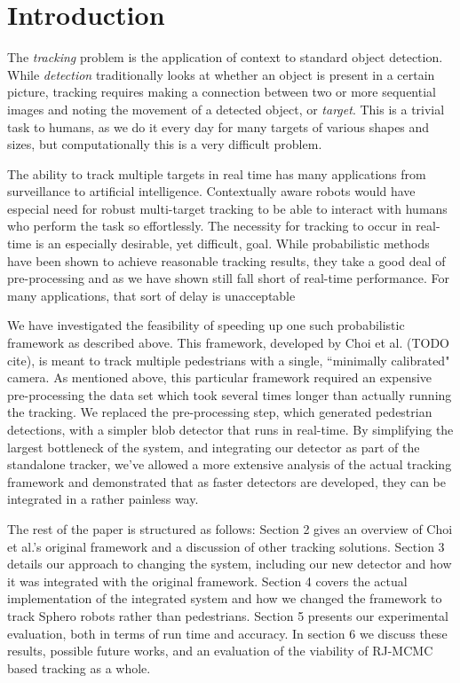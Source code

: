 \section{Introduction}
\label{sec:intro}

The \emph{tracking} problem is the application of context to standard object detection. While \emph{detection}
traditionally looks at whether an object is present in a certain picture, tracking requires making a connection between two
or more sequential images and noting the movement of a detected object, or \emph{target}. This is a trivial task to humans,
as we do it every day for many targets of various shapes and sizes, but computationally this is a very difficult problem.

The ability to track multiple targets in real time has many applications from surveillance to artificial intelligence. Contextually
aware robots would have especial need for robust multi-target tracking to be able to interact with humans who perform the
task so effortlessly. The necessity for tracking to occur in real-time is an especially desirable, yet difficult, goal. While
probabilistic methods have been shown to achieve reasonable tracking results, they take a good deal of pre-processing and as
we have shown still fall short of real-time performance. For many applications, that sort of delay is unacceptable 

We have investigated the feasibility of speeding up one such probabilistic framework as described above. This framework,
developed by Choi et al. (TODO cite), is meant to track multiple pedestrians with a single, ``minimally calibrated" camera. As
mentioned above, this particular framework required an expensive pre-processing the data set which took several times longer
than actually running the tracking. We replaced the pre-processing step, which generated pedestrian detections, with a simpler
blob detector that runs in real-time. By simplifying the largest bottleneck of the system, and integrating our detector as part of the
standalone tracker, we've allowed a more extensive analysis of the actual tracking framework and demonstrated that as faster
detectors are developed, they can be integrated in a rather painless way.

The rest of the paper is structured as follows: Section 2 gives an overview of Choi et al.'s original framework and a discussion of
other tracking solutions. Section 3 details our approach to changing the system, including our new detector and how it was
integrated with the original framework. Section 4 covers the actual implementation of the integrated system and how we changed
the framework to track Sphero robots rather than pedestrians. Section 5 presents our experimental evaluation, both in terms of
run time and accuracy. In section 6 we discuss these results, possible future works, and an evaluation of the viability of
RJ-MCMC based tracking as a whole.